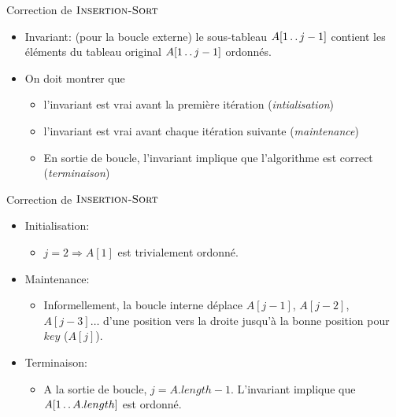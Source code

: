 \begin{frame}{Correction de $\textnormal{\scshape Insertion-Sort}$}

\begin{center}
\end{center}

\bigskip
\begin{itemize}
\item \alert{Invariant:} (pour la boucle externe) le sous-tableau $A[1\mathinner{\ldotp\ldotp} j-1]$ contient les éléments du tableau original $A[1\mathinner{\ldotp\ldotp} j-1]$ ordonnés.
\item On doit montrer que
\begin{itemize}
\item l'invariant est vrai avant la première itération ({\em intialisation})
\item l'invariant est vrai avant chaque itération suivante ({\em maintenance})
\item En sortie de boucle, l'invariant implique que l'algorithme est correct ({\em terminaison})
\end{itemize}
\end{itemize}
\end{frame}

\begin{frame}{Correction de $\textnormal{\scshape Insertion-Sort}$}
\begin{itemize}
\item Initialisation:
\begin{itemize}
\item $j=2 \Rightarrow A[1]$ est trivialement ordonné.
\end{itemize}
\bigskip
\item Maintenance:
\begin{itemize}
\item Informellement, la boucle interne déplace $A[j-1]$, $A[j-2]$, $A[j-3]\ldots$ d'une position vers la droite jusqu'à la bonne position pour $key$ ($A[j]$).
\end{itemize}
\bigskip
\item Terminaison:
\begin{itemize}
\item A la sortie de boucle, $j=A.length-1$. L'invariant implique que $A[1\mathinner{\ldotp\ldotp} A.length]$ est ordonné.
\end{itemize}
\end{itemize}
\end{frame}

